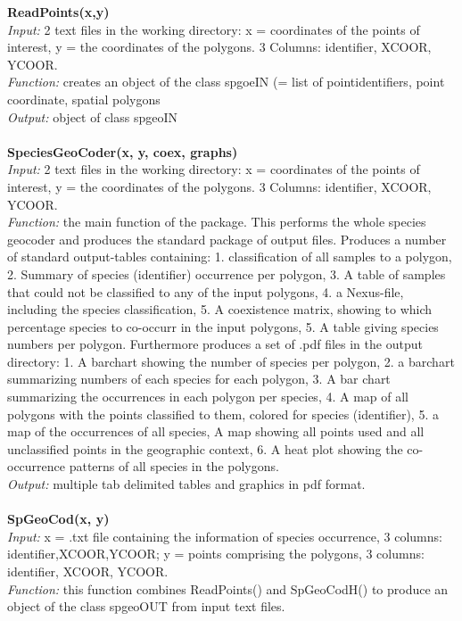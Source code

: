 \documentclass[a4paper,titlepage,11pt]{scrreprt}
\begin{document}
\textbf{ReadPoints(x,y)}\\
\textit{Input:} 2 text files in the working directory: x = coordinates of the points of interest, y = the coordinates of the polygons. 3 Columns: identifier, XCOOR, YCOOR.\\
\textit{Function:} creates an object of the class spgoeIN (= list of pointidentifiers, point coordinate, spatial polygons\\
\textit{Output:} object of class spgeoIN\\
\\
\textbf{SpeciesGeoCoder(x, y, coex, graphs)}\\
\textit{Input:} 2 text files in the working directory: x = coordinates of the points of interest, y = the coordinates of the polygons. 3 Columns: identifier, XCOOR, YCOOR.\\
\textit{Function:} the main function of the package. This performs the whole species geocoder and produces the standard package of output files. Produces a number of standard output-tables containing: 1. classification of all samples to a polygon, 2. Summary of species (identifier) occurrence per polygon, 3. A table of samples that could not be classified to any of the input polygons, 4. a Nexus-file, including the species classification, 5. A coexistence matrix, showing to which percentage species to co-occurr in the input polygons, 5. A table giving species numbers per polygon. Furthermore produces a set of .pdf files in the output directory: 1. A barchart showing the number of species per polygon, 2. a barchart summarizing numbers of each species for each polygon, 3. A bar chart summarizing the occurrences in each polygon per species, 4. A map of all polygons with the points classified to them, colored for species (identifier), 5. a map of the occurrences of all species, A map showing all points used and all unclassified points in the geographic context, 6. A heat plot showing the co-occurrence patterns of all species in the polygons.\\
\textit{Output:} multiple tab delimited tables and graphics in pdf format.\\
\\
\textbf{SpGeoCod(x, y)}\\
\textit{Input:} x = .txt file containing the information of species occurrence, 3 columns: identifier,XCOOR,YCOOR; y = points comprising the polygons, 3 columns: identifier, XCOOR, YCOOR.\\
\textit{Function:} this function combines ReadPoints() and SpGeoCodH() to produce an object of the class spgeoOUT from input text files.\\
\end{document}

